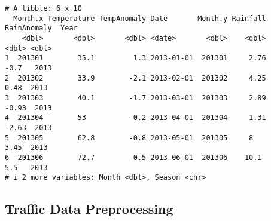 \documentclass[
  letterpaper,
  DIV=11,
  numbers=noendperiod]{scrreprt}
\begin{document}
\begin{verbatim}
# A tibble: 6 x 10
  Month.x Temperature TempAnomaly Date       Month.y Rainfall RainAnomaly  Year
    <dbl>       <dbl>       <dbl> <date>       <dbl>    <dbl>       <dbl> <dbl>
1  201301        35.1         1.3 2013-01-01  201301     2.76       -0.7   2013
2  201302        33.9        -2.1 2013-02-01  201302     4.25        0.48  2013
3  201303        40.1        -1.7 2013-03-01  201303     2.89       -0.93  2013
4  201304        53          -0.2 2013-04-01  201304     1.31       -2.63  2013
5  201305        62.8        -0.8 2013-05-01  201305     8           3.45  2013
6  201306        72.7         0.5 2013-06-01  201306    10.1         5.5   2013
# i 2 more variables: Month <dbl>, Season <chr>
\end{verbatim}

\subsection{Traffic Data
Preprocessing}\label{traffic-data-preprocessing}
\end{document}
